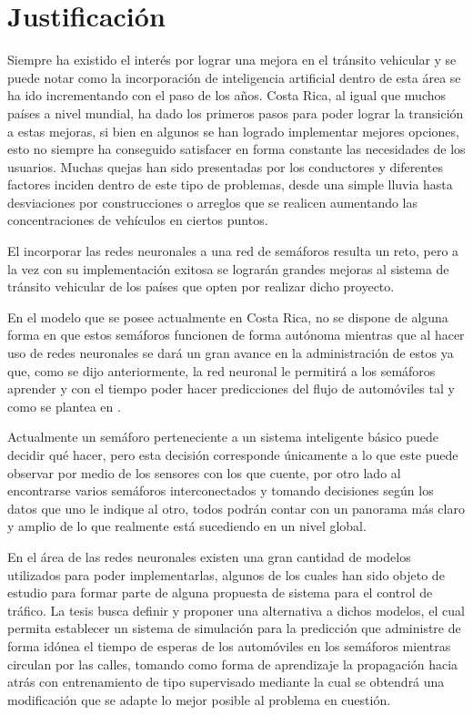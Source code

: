\section{Justificaci\'{o}n}

		
		Siempre ha existido el inter\'{e}s por lograr una mejora en el tr\'{a}nsito vehicular
	y se puede notar como la incorporaci\'{o}n de inteligencia artificial dentro de esta
	\'{a}rea  se ha ido incrementando con el paso de los a\~{n}os. Costa Rica, al
	igual que muchos pa\'{i}ses a nivel mundial, ha dado los primeros pasos para
	poder lograr la transici\'{o}n a estas mejoras, si bien en algunos se han
	logrado implementar mejores opciones, esto no siempre ha conseguido satisfacer
	en forma constante las necesidades de los usuarios. Muchas quejas han sido
	presentadas por los conductores y diferentes factores inciden dentro de este
	tipo de problemas, desde una simple lluvia hasta desviaciones por construcciones o arreglos que se realicen aumentando las concentraciones de veh\'{i}culos en ciertos puntos.\cite{Fallas2007}
	
		El incorporar las redes neuronales a una red de sem\'{a}foros resulta un reto,
	pero a la vez con su implementaci\'{o}n exitosa se lograr\'{a}n grandes mejoras al sistema
	de tr\'{a}nsito vehicular de los pa\'{i}ses que opten por realizar dicho proyecto.
	
		En el modelo que se posee actualmente en Costa Rica, no se dispone de alguna
	forma en que estos sem\'{a}foros funcionen de forma aut\'{o}noma mientras que al hacer
	uso de redes neuronales se dar\'{a} un gran avance en la administraci\'{o}n de estos ya
	que, como se dijo anteriormente, la red neuronal le permitir\'{a} a los
	sem\'{a}foros aprender y con el tiempo poder hacer predicciones del flujo de
	autom\'{o}viles tal y como se plantea en \cite{Gilmore1993}.
	
		Actualmente un sem\'{a}foro perteneciente a un sistema inteligente b\'{a}sico puede
	decidir qu\'{e} hacer, pero esta decisi\'{o}n corresponde \'{u}nicamente a lo que este
	puede observar por medio de los sensores con los que cuente, por otro lado al
	encontrarse varios sem\'{a}foros interconectados y tomando decisiones seg\'{u}n los datos que uno le indique al otro, todos podr\'{a}n contar con un panorama m\'{a}s claro y amplio de lo que realmente est\'{a} sucediendo en un nivel global.
	
		En el \'{a}rea de las redes neuronales existen una gran cantidad de modelos
	utilizados para poder implementarlas, algunos de los cuales han sido objeto de
	estudio para formar parte de alguna propuesta de sistema para el control de
	tr\'{a}fico. La tesis busca definir y  proponer una alternativa a dichos modelos, el cual permita establecer un sistema de simulaci\'{o}n para la predicci\'{o}n que administre de forma id\'{o}nea el tiempo de esperas de los autom\'{o}viles en los sem\'{a}foros mientras circulan por las calles, tomando como forma de aprendizaje la propagaci\'{o}n hacia atr\'{a}s con entrenamiento de tipo supervisado mediante la cual se obtendr\'{a} una modificaci\'{o}n que se adapte lo mejor posible al problema en cuesti\'{o}n.
	
